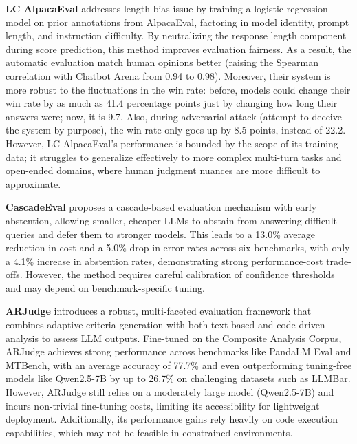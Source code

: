 \documentclass[sigconf, authoryear]{acmart}
\begin{document}
\textbf{LC AlpacaEval} addresses length bias issue by training a logistic regression model on prior annotations from AlpacaEval, factoring in model identity, prompt length, and instruction difficulty.
By neutralizing the response length component during score prediction, this method improves evaluation fairness.
As a result, the automatic evaluation match human opinions better (raising the Spearman correlation with Chatbot Arena from 0.94 to 0.98).
Moreover, their system is more robust to the fluctuations in the win rate: before, models could change their win rate by as much as 41.4 percentage points just by changing how long their answers were; now, it is 9.7.
Also, during adversarial attack (attempt to deceive the system by purpose), the win rate only goes up by 8.5 points, instead of 22.2.
However, LC AlpacaEval's performance is bounded by the scope of its training data; it struggles to generalize effectively to more complex multi-turn tasks and open-ended domains, where human judgment nuances are more difficult to approximate\cite{lc_alpacha}.


\textbf{CascadeEval} proposes a cascade-based evaluation mechanism with early abstention, allowing smaller, cheaper LLMs to abstain from answering difficult queries and defer them to stronger models.
This leads to a 13.0\% average reduction in cost and a 5.0\% drop in error rates across six benchmarks, with only a 4.1\% increase in abstention rates, demonstrating strong performance-cost trade-offs.
However, the method requires careful calibration of confidence thresholds and may depend on benchmark-specific tuning\cite{cascade_eval}.

\textbf{ARJudge} introduces a robust, multi-faceted evaluation framework that combines adaptive criteria generation with both text-based and code-driven analysis to assess LLM outputs.
Fine-tuned on the Composite Analysis Corpus, ARJudge achieves strong performance across benchmarks like PandaLM Eval and MTBench, with an average accuracy of 77.7\% and even outperforming tuning-free models like Qwen2.5-7B by up to 26.7\% on challenging datasets such as LLMBar.
However, ARJudge still relies on a moderately large model (Qwen2.5-7B) and incurs non-trivial fine-tuning costs, limiting its accessibility for lightweight deployment.
Additionally, its performance gains rely heavily on code execution capabilities, which may not be feasible in constrained environments\cite{ar_judge}.
\end{document}
